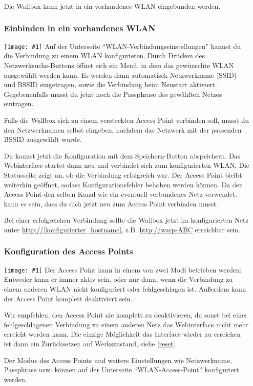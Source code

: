 \documentclass[a4paper,10pt]{article}
\newcommand{\hint}[1]{\begin{tcolorbox}[colback=boxgray,colframe=black,coltext=
white,title=Hinweis]#1\end{tcolorbox}}
\newcommand{\gfx}[1]{\texttt{[image: \#1]}}
\begin{document}
\begin{multicols*}{2}
	Die Wallbox kann jetzt in ein vorhandenes WLAN eingebunden werden.
	\subsubsection{Einbinden in ein vorhandenes WLAN}
	\gfx{./img_warp2/resized/web_wifi_sta}
	Auf der Unterseite \enquote{WLAN-Verbindungseinstellungen} kannst du die Verbindung zu einem WLAN konfigurieren.
	Durch Drücken des Netzwerksuche-Buttons öffnet sich ein Menü, in dem das gewünschte WLAN ausgewählt werden kann.
	Es werden dann automatisch Netzwerkname (SSID) und BSSID eingetragen, sowie die Verbindung beim Neustart aktiviert.
	Gegebenenfalls musst du jetzt noch die Passphrase des gewählten Netzes eintragen.

	Falls die Wallbox sich zu einem versteckten Access Point verbinden soll, musst du den Netzwerknamen selbst eingeben,
	nachdem das Netzwerk mit der passenden BSSID ausgewählt wurde.

	Du kannst jetzt die Konfiguration mit dem Speichern-Button abspeichern.
	Das Webinterface startet dann neu und verbindet sich zum konfigurierten WLAN. Die Statusseite zeigt
	an, ob die Verbindung erfolgreich war. Der Access Point bleibt weiterhin
	geöffnet, sodass Konfigurationsfehler behoben werden können.
	Da der Access Point den selben Kanal wie ein eventuell verbundenes Netz verwendet,
	kann es sein, dass du dich jetzt neu zum Access Point verbinden musst.

	Bei einer erfolgreichen Verbindung sollte die Wallbox jetzt im konfigurierten Netz unter
	\url{http://[konfigurierter_hostname]}, z.B. \url{http://warp-ABC} erreichbar sein.

	\subsubsection{Konfiguration des Access Points}
	\gfx{./img_warp2/resized/web_wifi_ap}
	Der Access Point kann in einem von zwei Modi betrieben werden: Entweder kann er immer aktiv sein,
	oder nur dann, wenn die Verbindung zu einem anderen WLAN nicht konfiguriert oder fehlgeschlagen ist.
	Außerdem kann der Access Point komplett deaktiviert sein.
	\hint{Wir empfehlen, den Access Point nie komplett zu deaktivieren, da sonst bei einer
		fehlgeschlagenen Verbindung zu einem anderen Netz das Webinterface nicht mehr erreicht
		werden kann. Die einzige Möglichkeit das Interface wieder zu erreichen ist dann ein Zurücksetzen auf Werkszustand, siehe \ref{reset}}
	Der Modus des Access Points und weitere Einstellungen wie Netzwerkname, Passphrase usw. können
	auf der Unterseite \enquote{WLAN-Access-Point} konfiguriert werden.


\end{multicols*}
\end{document}

